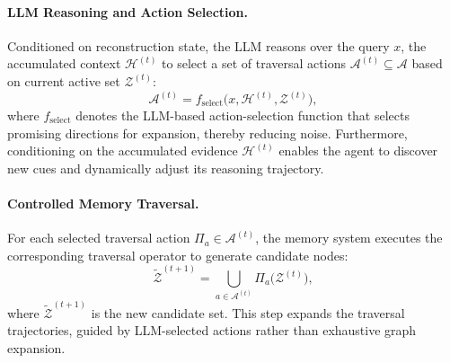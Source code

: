 \paragraph{LLM Reasoning and Action Selection.}
Conditioned on reconstruction state, the LLM reasons over the query $x$, the accumulated context $ \mathcal{H}^{(t)}$ to select a set of traversal actions $\mathcal{A}^{(t)} \subseteq \mathcal{A}$ based on current active set $\mathcal{Z}^{(t)}$:
\begin{equation}
\mathcal{A}^{(t)} = f_{\text{select}}\!\big( x, \mathcal{H}^{(t)}, \mathcal{Z}^{(t)}\big),
\end{equation}
where $f_{\text{select}}$ denotes the LLM-based action-selection function that selects promising directions for expansion, thereby reducing noise.
Furthermore, conditioning on the accumulated evidence $\mathcal{H}^{(t)}$
enables the agent to discover new cues and dynamically adjust its reasoning
trajectory. 

\paragraph{Controlled Memory Traversal.}
For each selected traversal action $\Pi_a \in \mathcal{A}^{(t)}$, the memory system executes the corresponding traversal operator to generate candidate  nodes:
\begin{equation}
\widetilde{\mathcal{Z}}^{(t+1)} =
\bigcup_{a \in \mathcal{A}^{(t)}} \Pi_a\!\big(\mathcal{Z}^{(t)}\big),
\end{equation}
where $\widetilde{\mathcal{Z}}^{(t+1)}$ is the new candidate set. This step expands the traversal trajectories, guided by LLM-selected actions
rather than exhaustive graph expansion.

